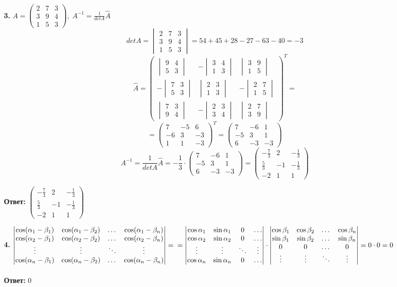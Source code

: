 \documentclass[a4paper]{article}
\newcommand{\mat}[1]{\begin{pmatrix} #1 \end{pmatrix}}
\renewcommand{\det}[1]{\begin{vmatrix} #1 \end{vmatrix}}
\renewcommand{\f}[2]{\frac{#1}{#2}}
\begin{document}
\begin{enumerate}
    \item[\textbf{3.}]$A = \mat{2 & 7 & 3 \\ 3 & 9 & 4 \\ 1 & 5 & 3}, \; A^{-1} = \f{1}{detA}\hat{A}$
          $$detA = \det{2 & 7 & 3 \\ 3 & 9 & 4 \\ 1 & 5 & 3} =  54 +45+28-27-63-40 = -3$$
          $$\hat{A} = \mat{\det{9 & 4 \\ 5 & 3} & -\det{3 & 4 \\ 1 & 3} & \det{3 & 9 \\ 1 & 5}\\
                  -\det{7 & 3 \\ 5 & 3} & \det{2 & 3 \\ 1 & 3} & -\det{2 & 7 \\ 1 & 5}\\
                  \det{7 & 3 \\ 9 & 4} & -\det{2 & 3 \\ 3 & 4} & \det{2 & 7 \\ 3 & 9}}^{T}=$$
          $$ = \mat{7 & -5 & 6 \\ -6 & 3 & -3 \\ 1 & 1 & -3}^{T} = \mat{7 & -6 & 1 \\ -5 & 3 & 1 \\ 6 & -3 & -3}$$
          $$A^{-1} = \f{1}{detA}\hat{A} = -\f{1}{3}\cdot \mat{7 & -6 & 1 \\ -5 & 3 & 1 \\ 6 & -3 & -3} = \mat{-\f{7}{3} & 2 &-\f{1}{3} \\ \f{5}{3} & -1 & -\f{1}{3} \\ -2 & 1 & 1}$$

          \textbf{Ответ: } $\mat{-\f{7}{3} & 2 &-\f{1}{3} \\ \f{5}{3} & -1 & -\f{1}{3} \\ -2 & 1 & 1}$

    \item[\textbf{4.}]
    $\det{\cos(\alpha_1 - \beta_1) & \cos(\alpha_1 - \beta_2) & \dots & \cos(\alpha_1 - \beta_n) \\
    \cos(\alpha_2 - \beta_1) & \cos(\alpha_2 - \beta_2) & \dots & \cos(\alpha_2 - \beta_n) \\
    \vdots & \vdots & \ddots & \vdots \\
    \cos(\alpha_n - \beta_1) & \cos(\alpha_n - \beta_2) & \dots & \cos(\alpha_n - \beta_n)} =\\
    = \det{\cos\alpha_1 & \sin\alpha_1 & 0 & \dots \\
    \cos\alpha_2 & \sin\alpha_2 & 0 & \dots \\
    \vdots & \vdots & \ddots & \vdots \\
    \cos\alpha_n & \sin\alpha_n & 0 & \dots}\cdot \det{\cos\beta_1 & \cos\beta_2 & \dots & \cos\beta_n \\
    \sin\beta_1 & \sin\beta_2 & \dots & \sin\beta_n \\
    0 & 0 & \dots & 0 \\
    \vdots & \vdots & \ddots & \vdots} =0\cdot 0 = 0$ \\\\
    \textbf{Ответ: } $0$\\


\end{enumerate}
\end{document}

